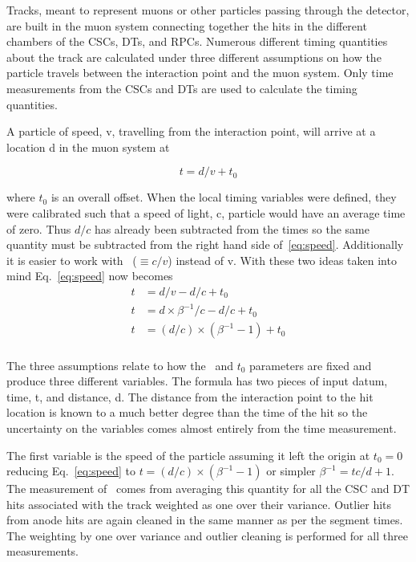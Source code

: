 Tracks, meant to represent muons or other particles passing through the detector, are built in the muon system connecting together the hits in the different chambers of
the CSCs, DTs, and RPCs. Numerous different timing quantities about the track are calculated under three different assumptions on how the particle
travels between the interaction point and the muon system. Only time measurements from the CSCs and DTs are used to calculate the timing quantities.

A particle of speed, v, travelling from the interaction point, will arrive at a location d in the muon system at

\begin{equation}
t = d/v + t_0
\label{eq:speed}
\end{equation}

where $t_0$ is an overall offset. When the local timing variables were defined, they were calibrated such that a speed of light, c, particle would have an average time
of zero. Thus $d/c$ has already been subtracted from the times so the same quantity must be subtracted from the right hand side of~\ref{eq:speed}.
Additionally it is easier to work with \invbeta\ ($\equiv{c/v}$) instead of v. With these two ideas taken into mind Eq.~\ref{eq:speed} now becomes
\begin{equation}
\begin{split}
t &= d/v - d/c + t_0 \\
t &= d \times \beta^{-1} / c - d/c + t_0 \\
t &= (d / c) \times (\beta^{-1} - 1) + t_0 \\
\end{split}
\label{eq:speedred}
\end{equation}

The three assumptions relate to how the \invbeta\ and $t_0$ parameters are fixed and produce three different variables. 
The formula has two pieces of input datum, time, t, and distance, d. The distance
from the interaction point to the hit location is known to a much better degree than the time of the hit so the uncertainty on the variables comes 
almost entirely from the time measurement.

The first variable is the speed of the particle assuming it left the origin at $t_0 = 0$ reducing Eq.~\ref{eq:speed} to $t = (d / c) \times (\beta^{-1} - 1)$ or simpler
$\beta^{-1} = tc/d + 1$. The measurement of \invbeta\ comes from averaging this quantity for all the
CSC and DT hits associated with the track weighted as one over their variance.
Outlier hits from anode hits are again cleaned in the same manner as per the segment times. The weighting by one over variance and 
outlier cleaning is performed for all three measurements.

